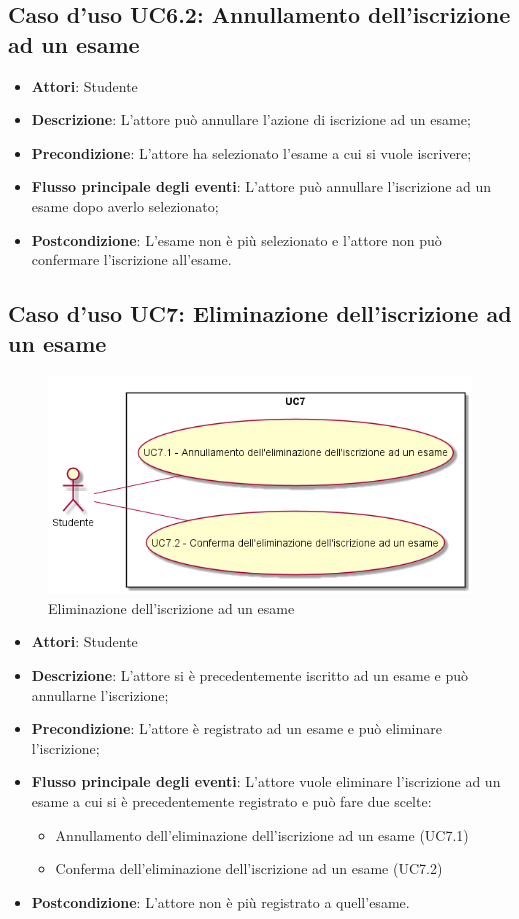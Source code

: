\subsection{Caso d'uso \texorpdfstring{UC6.2}{UC6.2}: Annullamento dell'iscrizione ad un esame}
\begin{itemize}
\item \textbf{Attori}: Studente
\item \textbf{Descrizione}: L'attore può annullare l'azione di iscrizione ad un esame;
\item \textbf{Precondizione}: L'attore ha selezionato l'esame a cui si vuole iscrivere;
\item \textbf{Flusso principale degli eventi}: L'attore può annullare l'iscrizione ad un esame dopo averlo selezionato;
\item \textbf{Postcondizione}: L'esame non è più selezionato e l'attore non può confermare l'iscrizione all'esame.
\end{itemize}
\subsection{Caso d'uso \texorpdfstring{UC7}{UC7}: Eliminazione dell'iscrizione ad un esame}
\begin{figure} [H]
\centering
\includegraphics[scale=0.45]{./img/UC7.png}
\caption{Eliminazione dell'iscrizione ad un esame}\label{}
\end{figure}
\begin{itemize}
\item \textbf{Attori}: Studente
\item \textbf{Descrizione}: L'attore si è precedentemente iscritto ad un esame e può annullarne l'iscrizione;
\item \textbf{Precondizione}: L'attore è registrato ad un esame e può eliminare l'iscrizione;
\item \textbf{Flusso principale degli eventi}: L'attore vuole eliminare l'iscrizione ad un esame a cui si è precedentemente registrato e può fare due scelte:
\begin{itemize}
\item Annullamento dell'eliminazione dell'iscrizione ad un esame (UC7.1)
\item Conferma dell'eliminazione dell'iscrizione ad un esame (UC7.2)
\end{itemize}
\item \textbf{Postcondizione}: L'attore non è più registrato a quell'esame.
\end{itemize}
